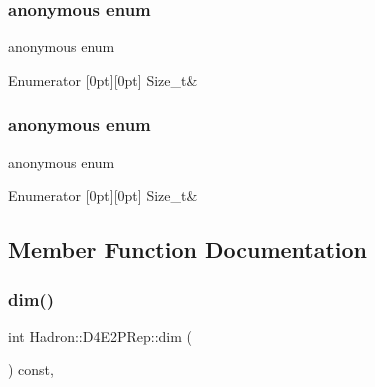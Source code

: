\subsubsection{\texorpdfstring{anonymous enum}{anonymous enum}}
{\footnotesize\ttfamily anonymous enum}

\begin{DoxyEnumFields}{Enumerator}
[0pt][0pt]{}\mbox{\label{structHadron_1_1D4E2PRep_a264f51ac7118893521e369c199e577ada64a39cf698903d8a11cf0f02c3c9f36a}} 
Size\+\_\+t&\\
\hline

\end{DoxyEnumFields}
\mbox{\label{structHadron_1_1D4E2PRep_a264f51ac7118893521e369c199e577ad}} 
\subsubsection{\texorpdfstring{anonymous enum}{anonymous enum}}
{\footnotesize\ttfamily anonymous enum}

\begin{DoxyEnumFields}{Enumerator}
[0pt][0pt]{}\mbox{\label{structHadron_1_1D4E2PRep_a264f51ac7118893521e369c199e577ada64a39cf698903d8a11cf0f02c3c9f36a}} 
Size\+\_\+t&\\
\hline

\end{DoxyEnumFields}


\subsection{Member Function Documentation}
\mbox{\label{structHadron_1_1D4E2PRep_a840b6fdd348949a1a1c0fa8c2f9f9ecd}} 
\subsubsection{\texorpdfstring{dim()}{dim()}\hspace{0.1cm}{\footnotesize\ttfamily [1/2]}}
{\footnotesize\ttfamily int Hadron\+::\+D4\+E2\+P\+Rep\+::dim (\begin{DoxyParamCaption}{ }\end{DoxyParamCaption}) const\hspace{0.3cm}{\ttfamily [inline]}, {\ttfamily [virtual]}}

